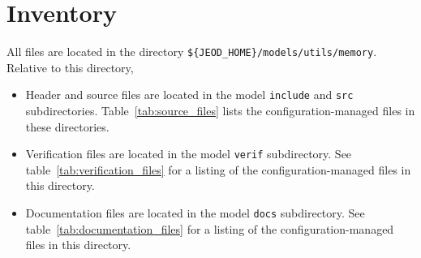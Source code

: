 \newpage
\section{Inventory}
All \ModelDesc files are located in the directory
{\tt \$\{JEOD\_HOME\}/models/utils/memory}.
Relative to this directory,
\begin{itemize}
\vspace{-0.2\baselineskip}
\item Header and source files are located
in the model {\tt include} and {\tt src} subdirectories.
Table~\ref{tab:source_files} lists the 
configuration-managed files in these directories.
\vspace{-0.1\baselineskip}
\item Verification files are located in the model {\tt verif} subdirectory.
See table~\ref{tab:verification_files}
for a listing of the 
configuration-managed files in this directory.
\vspace{-0.1\baselineskip}
\item Documentation files are located in the model {\tt docs} subdirectory.
See table~\ref{tab:documentation_files}
for a listing of the 
configuration-managed files in this directory.
\end{itemize}


